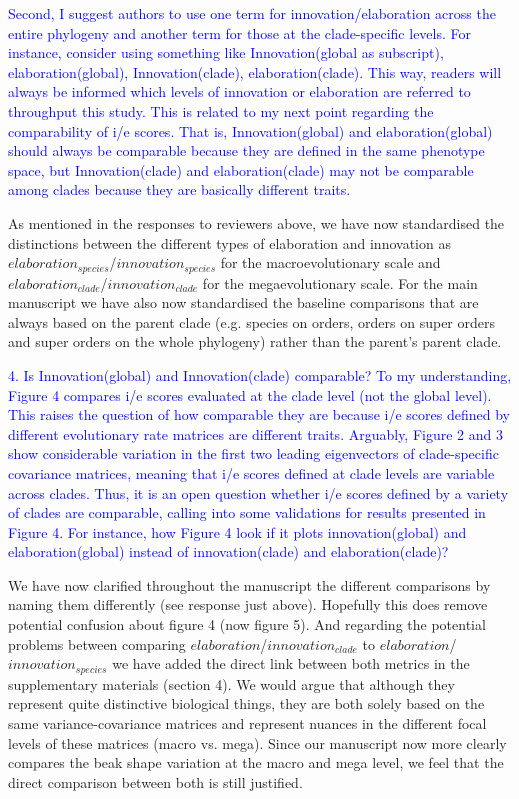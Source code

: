 \documentclass[12pt,letterpaper]{article}
\begin{document}
{\textcolor{blue}{Second, I suggest authors to use one term for innovation/elaboration across the entire phylogeny and another term for those at the clade-specific levels. For instance, consider using something like Innovation(global as subscript), elaboration(global), Innovation(clade), elaboration(clade). This way, readers will always be informed which levels of innovation or elaboration are referred to throughput this study. This is related to my next point regarding the comparability of i/e scores. That is, Innovation(global) and elaboration(global) should always be comparable because they are defined in the same phenotype space, but Innovation(clade) and elaboration(clade) may not be comparable among clades because they are basically different traits.}

As mentioned in the responses to reviewers above, we have now standardised the distinctions between the different types of elaboration and innovation as $elaboration_{species}$/$innovation_{species}$ for the macroevolutionary scale and $elaboration_{clade}$/$innovation_{clade}$ for the megaevolutionary scale. For the main manuscript we have also now standardised the baseline comparisons that are always based on the parent clade (e.g. species on orders, orders on super orders and super orders on the whole phylogeny) rather than the parent’s parent clade.

\textcolor{blue}{4. Is Innovation(global) and Innovation(clade) comparable?
To my understanding, Figure 4 compares i/e scores evaluated at the clade level (not the global level). This raises the question of how comparable they are because i/e scores defined by different evolutionary rate matrices are different traits. Arguably, Figure 2 and 3 show considerable variation in the first two leading eigenvectors of clade-specific covariance matrices, meaning that i/e scores defined at clade levels are variable across clades. Thus, it is an open question whether i/e scores defined by a variety of clades are comparable, calling into some validations for results presented in Figure 4. For instance, how Figure 4 look if it plots innovation(global) and elaboration(global) instead of innovation(clade) and elaboration(clade)?}

We have now clarified throughout the manuscript the different comparisons by naming them differently (see response just above). Hopefully this does remove potential confusion about figure 4 (now figure 5). And regarding the potential problems between comparing $elaboration$/$innovation_{clade}$ to $elaboration$/$innovation_{species}$ we have added the direct link between both metrics in the supplementary materials (section 4). We would argue that although they represent quite distinctive biological things, they are both solely based on the same variance-covariance matrices and represent nuances in the different focal levels of these matrices (macro vs. mega). Since our manuscript now more clearly compares the beak shape variation at the macro and mega level, we feel that the direct comparison between both is still justified.


}
\end{document}
